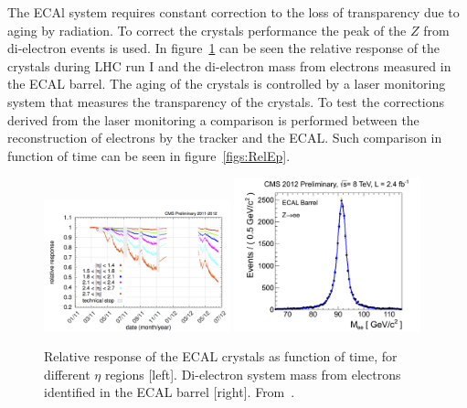 The ECAl system requires constant correction to the loss of transparency due to aging by radiation. To correct the crystals performance the peak of the $Z$ from di-electron events is used. In figure~\ref{fig:RelaResp} can be seen the relative response of the crystals during LHC run I and the di-electron mass from electrons measured in the ECAL barrel. The aging of the crystals is controlled by a laser monitoring system that measures the transparency of the crystals. To test the corrections derived from the laser monitoring a comparison is performed between the reconstruction of electrons by the tracker and the ECAL. Such comparison in function of time can be seen in figure~\ref{figs:RelEp}.

\begin{figure}[!Hhtbp]
  \begin{center}
    \includegraphics[width=0.48\textwidth]{figs/laser_monitoring_histories_2011-2012.png}
    \includegraphics[width=0.48\textwidth]{figs/_500___2012_zee_eb_golden.png}
    \caption{Relative response of the ECAL crystals as function of time, for different $\eta$ regions [left]. Di-electron system mass from electrons identified in the ECAL barrel [right]. From~\cite{CMS-DP-2012-015}.}
    \label{fig:RelaResp}
  \end{center}
\end{figure}

